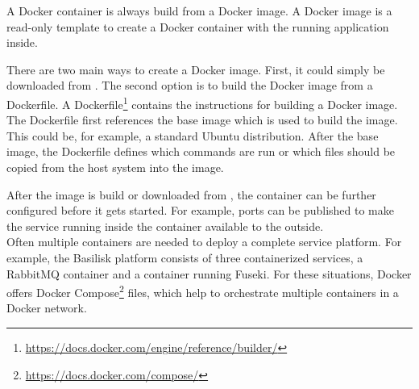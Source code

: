 A Docker container is always build from a Docker image.
A Docker image is a read-only template to create a Docker container with the running application inside.

There are two main ways to create a Docker image.
First, it could simply be downloaded from \dockh{}.
The second option is to build the Docker image from a Dockerfile.
A Dockerfile\footnote{\url{https://docs.docker.com/engine/reference/builder/}} contains the instructions for building a Docker image.
The Dockerfile first references the base image which is used to build the image.
This could be, for example, a standard Ubuntu distribution.
After the base image, the Dockerfile defines which commands are run or which files should be copied from the host system into the image.

After the image is build or downloaded from \dockh{}, the container can be further configured before it gets started.
For example, ports can be published to make the service running inside the container available to the outside.
\\

Often multiple containers are needed to deploy a complete service platform.
For example, the Basilisk platform consists of three containerized services, a RabbitMQ container and a container running Fuseki.
For these situations, Docker offers Docker Compose\footnote{\url{https://docs.docker.com/compose/}} files, which help to orchestrate multiple containers in a Docker network.



